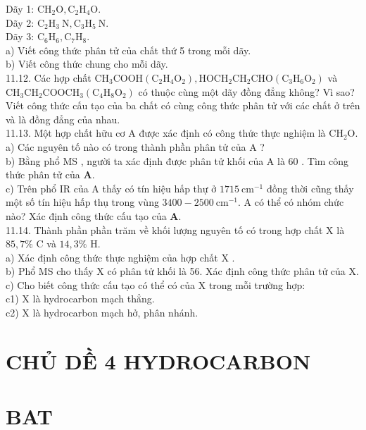 \documentclass[10pt]{article}
\begin{document}
Dãy 1: $\mathrm{CH}_{2} \mathrm{O}, \mathrm{C}_{2} \mathrm{H}_{4} \mathrm{O}$.\\
Dãy 2: $\mathrm{C}_{2} \mathrm{H}_{3} \mathrm{~N}, \mathrm{C}_{3} \mathrm{H}_{5} \mathrm{~N}$.\\
Dãy 3: $\mathrm{C}_{6} \mathrm{H}_{6}, \mathrm{C}_{7} \mathrm{H}_{8}$.\\
a) Viết công thức phân tử của chất thứ 5 trong mỗi dãy.\\
b) Viết công thức chung cho mỗi dãy.\\
11.12. Các hợp chất $\mathrm{CH}_{3} \mathrm{COOH}\left(\mathrm{C}_{2} \mathrm{H}_{4} \mathrm{O}_{2}\right), \mathrm{HOCH}_{2} \mathrm{CH}_{2} \mathrm{CHO}\left(\mathrm{C}_{3} \mathrm{H}_{6} \mathrm{O}_{2}\right)$ và $\mathrm{CH}_{3} \mathrm{CH}_{2} \mathrm{COOCH}_{3}\left(\mathrm{C}_{4} \mathrm{H}_{8} \mathrm{O}_{2}\right)$ có thuộc cùng một dãy đồng đẳng không? Vì sao? Viết công thức cấu tạo của ba chất có cùng công thức phân tử với các chất ở trên và là đồng đẳng của nhau.\\
11.13. Một hợp chất hữu cơ A được xác định có công thức thực nghiệm là $\mathrm{CH}_{2} \mathrm{O}$.\\
a) Các nguyên tố nào có trong thành phần phân tử của A ?\\
b) Bằng phổ MS , người ta xác định được phân tử khối của A là 60 . Tìm công thức phân tử của $\mathbf{A}$.\\
c) Trên phổ IR của A thấy có tín hiệu hấp thự ở $1715 \mathrm{~cm}^{-1}$ đồng thời cũng thấy một số tín hiệu hấp thụ trong vùng $3400-2500 \mathrm{~cm}^{-1}$. A có thể có nhóm chức nào? Xác định công thức cấu tạo của $\mathbf{A}$.\\
11.14. Thành phần phần trăm về khối lượng nguyên tố có trong hợp chất X là $85,7 \%$ C và $14,3 \%$ H.\\
a) Xác định công thức thực nghiệm của hợp chất X .\\
b) Phổ MS cho thấy X có phân tử khối là 56. Xác định công thức phân tử của X.\\
c) Cho biết công thức cấu tạo có thể có của X trong mỗi trường hợp:\\
c1) X là hydrocarbon mạch thẳng.\\
c2) X là hydrocarbon mạch hở, phân nhánh.

\section*{CHỦ DỀ 4 HYDROCARBON}
\section*{BAT}
\end{document}
